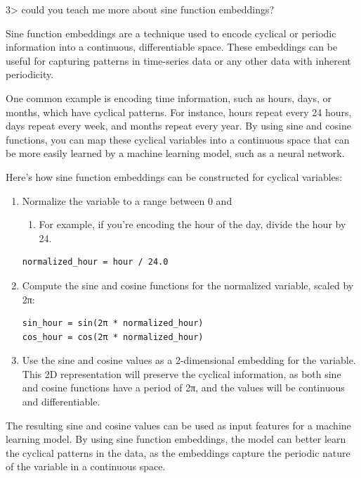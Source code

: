 \documentclass[
]{article}
\providecommand{\tightlist}{%
  \setlength{\itemsep}{0pt}\setlength{\parskip}{0pt}}
\begin{document}
3\textgreater{} could you teach me more about sine function embeddings?

Sine function embeddings are a technique used to encode cyclical or
periodic information into a continuous, differentiable space. These
embeddings can be useful for capturing patterns in time-series data or
any other data with inherent periodicity.

One common example is encoding time information, such as hours, days, or
months, which have cyclical patterns. For instance, hours repeat every
24 hours, days repeat every week, and months repeat every year. By using
sine and cosine functions, you can map these cyclical variables into a
continuous space that can be more easily learned by a machine learning
model, such as a neural network.

Here's how sine function embeddings can be constructed for cyclical
variables:

\begin{enumerate}
\def\labelenumi{\arabic{enumi}.}
\item
  Normalize the variable to a range between 0 and

  \begin{enumerate}
  \def\labelenumii{\arabic{enumii}.}
  \tightlist
  \item
    For example, if you're encoding the hour of the day, divide the hour
    by 24.
  \end{enumerate}

\begin{verbatim}
normalized_hour = hour / 24.0
\end{verbatim}
\item
  Compute the sine and cosine functions for the normalized variable,
  scaled by 2π:

\begin{verbatim}
sin_hour = sin(2π * normalized_hour)
cos_hour = cos(2π * normalized_hour)
\end{verbatim}
\item
  Use the sine and cosine values as a 2-dimensional embedding for the
  variable. This 2D representation will preserve the cyclical
  information, as both sine and cosine functions have a period of 2π,
  and the values will be continuous and differentiable.
\end{enumerate}

The resulting sine and cosine values can be used as input features for a
machine learning model. By using sine function embeddings, the model can
better learn the cyclical patterns in the data, as the embeddings
capture the periodic nature of the variable in a continuous space.
\end{document}
